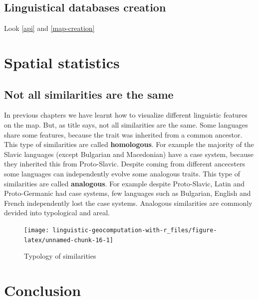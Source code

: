 \documentclass[]{book}
\theoremstyle{definition}
\theoremstyle{definition}
\theoremstyle{definition}
\theoremstyle{remark}
\begin{document}
\section{Linguistical databases creation}\label{db-creation}

Look \ref{api} and \ref{map-creation}

\chapter{Spatial statistics}\label{statistics}

\section{Not all similarities are the
same}\label{not-all-similarities-are-the-same}

In previous chapters we have learnt how to visualize different
linguistic features on the map. But, as title says, not all similarities
are the same. Some languages share some features, because the trait was
inherited from a common ancestor. This type of similarities are called
\textbf{homologous}. For example the majority of the Slavic languages
(except Bulgarian and Macedonian) have a case system, because they
inherited this from Proto-Slavic. Despite coming from different
ancecsters some languages can independently evolve some analogous
traits. This type of similarities are called \textbf{analogous}. For
example despite Proto-Slavic, Latin and Proto-Germanic had case systems,
few languages such as Bulgarian, English and French independently lost
the case systems. Analogous similarities are commonly devided into
typological and areal.

\begin{figure}

{\centering \texttt{[image: linguistic-geocomputation-with-r\_files/figure-latex/unnamed-chunk-16-1]} 

}

\caption{Typology of similarities}\label{fig:unnamed-chunk-16}
\end{figure}

\chapter{Conclusion}\label{conclusion}


\end{document}
